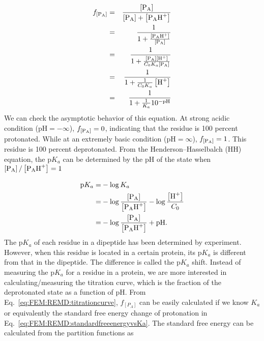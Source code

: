\begin{eqnarray}
	f_{\left[\ce{P_{A}}\right]} & = & \frac{\left[\ce{P_{A}}\right]}{\left[\ce{P_{A}}\right]+\left[\ce{P_{A}H^{+}}\right]}\nonumber \\
	& = & \frac{1}{1+\frac{\left[\ce{P_{A}H^{+}}\right]}{\left[\ce{P_{A}}\right]}}\nonumber \\
	& = & \frac{1}{1+\frac{\left[\ce{P_{A}}\right]\left[\ce{H^{+}}\right]}{C_{0}K_{a}\left[\ce{P_{A}}\right]}}\nonumber \\
	& = & \frac{1}{1+\frac{1}{C_{0}K_{a}}\left[\ce{H^{+}}\right]}\nonumber \\
	& = & \frac{1}{1+\frac{1}{K_{a}}10^{-\mathrm{pH}}}\label{eq:FEM:REMD:titrationcurve}
\end{eqnarray}
We can check the asymptotic behavior of this equation. At strong
acidic condition ($\mathrm{pH}=-\infty$), $f_{\left[\ce{P_{A}}\right]}=0$, indicating that
the residue is 100 percent protonated. While at an extremely basic
condition ($\mathrm{pH}=\infty$), $f_{\left[\ce{P_{A}}\right]}=1$. This residue is 100
percent deprotonated. From the Henderson–Hasselbalch (HH) equation, 
the $\mathrm{p}K_a$ can be determined by the $\mathrm{pH}$ of the state when 
$\left[\ce{P_{A}}\right]/\left[\ce{P_{A}H^{+}}\right]=1$

\begin{align}
	\mathrm{p}K_{a}  = & -\log{K_{a}}\notag\\
	 = & -\log{\frac{\left[\ce{P_{A}}\right]}{\left[\ce{P_{A}H^{+}}\right]}}-\log{\frac{\left[\ce{H^{+}}\right]}{C_{0}}}\notag\\
	 = & -\log{\frac{\left[\ce{P_{A}}\right]}{\left[\ce{P_{A}H^{+}}\right]}}+\mathrm{pH}.
	 \label{eq:FEM:REMD:pKa}
\end{align}
The $\mathrm{p}K_{a}$ of each residue in a dipeptide has been determined by
experiment. However, when this residue is located in a certain protein,
its $\mathrm{p}K_{a}$ is different from that in the dipeptide. The difference
is called the $\mathrm{p}K_{a}$ shift. Instead of measuring the $\mathrm{p}K_{a}$
for a residue in a protein, we are more interested in calculating/measuring
the titration curve, which is the fraction of the deprotonated state
as a function of pH. From Eq.~\ref{eq:FEM:REMD:titrationcurve}, $f_{\left[P_{A}\right]}$
can be easily calculated if we know $K_{a}$ or equivalently the standard
free energy change of protonation in Eq.~\ref{eq:FEM:REMD:standardfreeenergyvsKa}.
The standard free energy can be calculated from the partition functions
as

